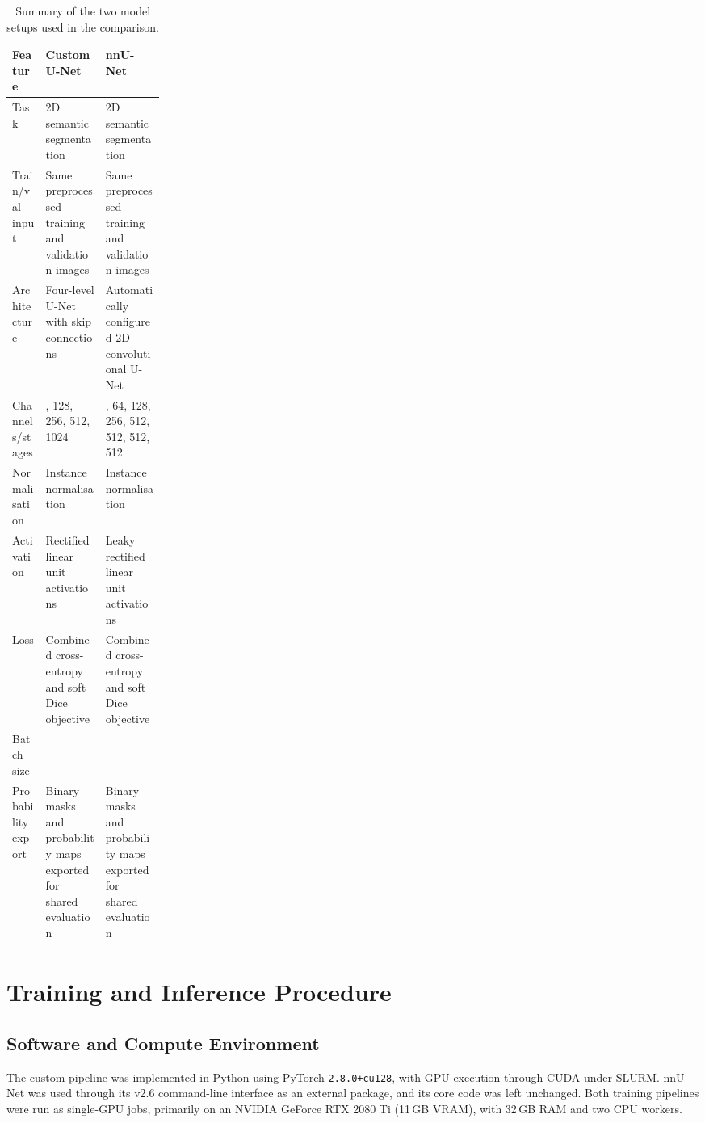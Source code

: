 \documentclass[logo,bsc,singlespacing,parskip,online]{infthesis}
\begin{document}
\begin{table}[H]
\centering
\small
\caption{Summary of the two model setups used in the comparison.}
\label{tab:model-summary}
\renewcommand{\arraystretch}{1.15}
\setlength{\tabcolsep}{5pt}
\begin{tabularx}{\linewidth}{
>{\raggedright\arraybackslash}p{0.22\linewidth}
>{\raggedright\arraybackslash}X
>{\raggedright\arraybackslash}X}
\toprule
\textbf{Feature} & \textbf{Custom U-Net} & \textbf{nnU-Net} \\
\midrule
Task
& 2D semantic segmentation
& 2D semantic segmentation \\
Train/val input
& Same preprocessed training and validation images
& Same preprocessed training and validation images \\
Architecture
& Four-level U-Net with skip connections
& Automatically configured 2D convolutional U-Net \\
Channels/stages
& 64, 128, 256, 512, 1024
& 32, 64, 128, 256, 512, 512, 512, 512 \\
Normalisation
& Instance normalisation
& Instance normalisation \\
Activation
& Rectified linear unit activations
& Leaky rectified linear unit activations \\
Loss
& Combined cross-entropy and soft Dice objective
& Combined cross-entropy and soft Dice objective \\
Batch size
& 4
& 12 \\
Probability export
& Binary masks and probability maps exported for shared evaluation
& Binary masks and probability maps exported for shared evaluation \\
\bottomrule
\end{tabularx}
\end{table}

\section{Training and Inference Procedure}

\subsection{Software and Compute Environment}

The custom pipeline was implemented in Python using PyTorch
\texttt{2.8.0+cu128}, with GPU execution through CUDA under SLURM. nnU-Net was used through its
v2.6 command-line interface as an external package, and its core code was left
unchanged. Both training pipelines were run as single-GPU jobs, primarily on an
NVIDIA GeForce RTX 2080 Ti (11\,GB VRAM), with 32\,GB RAM and two CPU workers.
\end{document}

